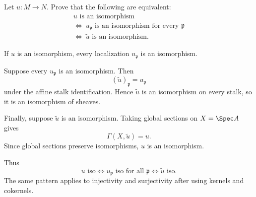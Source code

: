 \begin{problem}\label{prob:vi33-16}
Let \(u:M\to N\). Prove that the following are equivalent:
\[
\begin{gathered}
u\text{ is an isomorphism}\\
\Longleftrightarrow\
u_{\mathfrak p}\text{ is an isomorphism for every }\mathfrak p\\
\Longleftrightarrow\
\widetilde u\text{ is an isomorphism}.
\end{gathered}
\]

\end{problem}

\ifdefined\FullProblemDossiers
\begin{solution}
If \(u\) is an isomorphism, every localization \(u_{\mathfrak p}\) is an isomorphism.

Suppose every \(u_{\mathfrak p}\) is an isomorphism.  Then
\[
(\widetilde u)_{\mathfrak p}
=
u_{\mathfrak p}
\]
under the affine stalk identification. Hence \(\widetilde u\) is an isomorphism on every stalk, so it is an
isomorphism of sheaves.

Finally, suppose \(\widetilde u\) is an isomorphism. Taking global sections on \(X=\Spec A\) gives
\[
\Gamma(X,\widetilde u)=u.
\]
Since global sections preserve isomorphisms, \(u\) is an isomorphism.

Thus
\[
\boxed{
u\text{ iso}
\iff
u_{\mathfrak p}\text{ iso for all }\mathfrak p
\iff
\widetilde u\text{ iso}.
}
\]
The same pattern applies to injectivity and surjectivity after using kernels and cokernels.
\end{solution}
\fi
